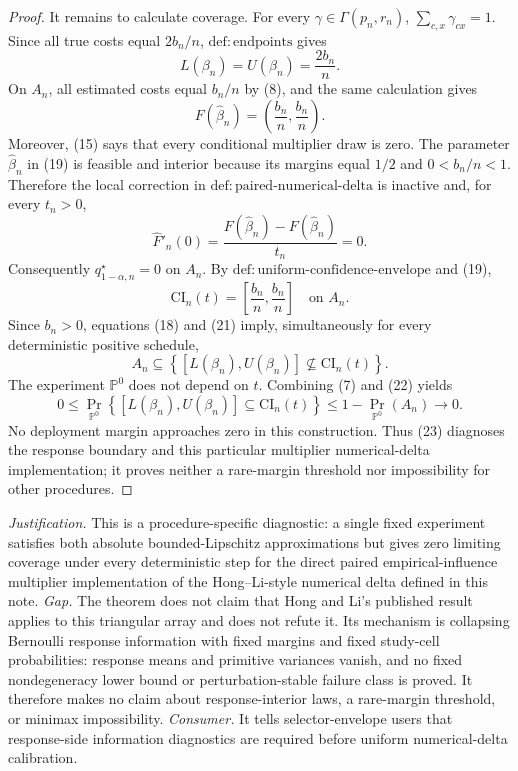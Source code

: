 \documentclass{article}
\begin{document}
\begin{proof}
It remains to calculate coverage.  For every \(\gamma\in\Gamma(p_n,r_n)\), \(\sum_{c,x}\gamma_{cx}=1\).  Since all true costs equal \(2b_n/n\), \(\mathrm{def:endpoints}\) gives
\[
L(\beta_n)=U(\beta_n)=\frac{2b_n}{n}.
\tag{18}
\]
On \(A_n\), all estimated costs equal \(b_n/n\) by (8), and the same calculation gives
\[
F(\widehat\beta_n)=\left(\frac{b_n}{n},\frac{b_n}{n}\right).
\tag{19}
\]
Moreover, (15) says that every conditional multiplier draw is zero.  The parameter \(\widehat\beta_n\) in (19) is feasible and interior because its margins equal \(1/2\) and \(0<b_n/n<1\).  Therefore the local correction in \(\mathrm{def:paired\text{-}numerical\text{-}delta}\) is inactive and, for every \(t_n>0\),
\[
\widehat F'_n(0)
=\frac{F(\widehat\beta_n)-F(\widehat\beta_n)}{t_n}
=0.
\tag{20}
\]
Consequently \(q_{1-\alpha,n}^\star=0\) on \(A_n\).  By \(\mathrm{def:uniform\text{-}confidence\text{-}envelope}\) and (19),
\[
\mathrm{CI}_n(t)=\left[\frac{b_n}{n},\frac{b_n}{n}\right]
\quad\text{on }A_n.
\tag{21}
\]
Since \(b_n>0\), equations (18) and (21) imply, simultaneously for every deterministic positive schedule,
\[
A_n\subseteq
\left\{[L(\beta_n),U(\beta_n)]\not\subseteq\mathrm{CI}_n(t)\right\}.
\tag{22}
\]
The experiment \(\mathbb P^0\) does not depend on \(t\).  Combining (7) and (22) yields
\[
0\leq
\Pr_{\mathbb P^0}\!\left\{
[L(\beta_n),U(\beta_n)]\subseteq\mathrm{CI}_n(t)
\right\}
\leq1-\Pr_{\mathbb P^0}(A_n)
\longrightarrow0.
\tag{23}
\]
No deployment margin approaches zero in this construction.  Thus (23) diagnoses the response boundary and this particular multiplier numerical-delta implementation; it proves neither a rare-margin threshold nor impossibility for other procedures.
\end{proof}
\par\smallskip\noindent \textit{Justification.} This is a procedure-specific diagnostic: a single fixed experiment satisfies both absolute bounded-Lipschitz approximations but gives zero limiting coverage under every deterministic step for the direct paired empirical-influence multiplier implementation of the Hong--Li-style numerical delta defined in this note. \textit{Gap.} The theorem does not claim that Hong and Li's published result applies to this triangular array and does not refute it. Its mechanism is collapsing Bernoulli response information with fixed margins and fixed study-cell probabilities: response means and primitive variances vanish, and no fixed nondegeneracy lower bound or perturbation-stable failure class is proved. It therefore makes no claim about response-interior laws, a rare-margin threshold, or minimax impossibility. \textit{Consumer.} It tells selector-envelope users that response-side information diagnostics are required before uniform numerical-delta calibration.
\end{document}
